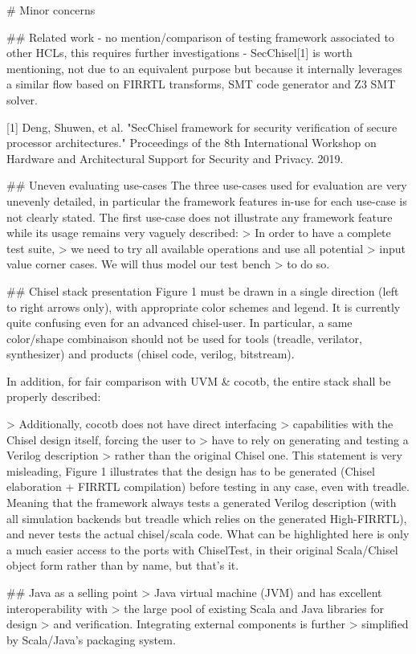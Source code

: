 \documentclass{article}
\begin{document}
\# Minor concerns

\#\# Related work
- no mention/comparison of testing framework associated to other HCLs, this requires further investigations
- SecChisel[1] is worth mentioning, not due to an equivalent purpose but because it internally leverages a similar flow based on FIRRTL transforms, SMT code generator and Z3 SMT solver.

[1] Deng, Shuwen, et al. "SecChisel framework for security verification of secure processor architectures." Proceedings of the 8th International Workshop on Hardware and Architectural Support for Security and Privacy. 2019.

\#\# Uneven evaluating use-cases
The three use-cases used for evaluation are very unevenly detailed, in particular the framework features in-use for each use-case is not clearly stated.
The first use-case does not illustrate any framework feature while its usage remains very vaguely described:
> In order to have a complete test suite,
> we need to try all available operations and use all potential
> input value corner cases. We will thus model our test bench
> to do so.  


\#\# Chisel stack presentation
Figure 1 must be drawn in a single direction (left to right arrows only), with appropriate color schemes and legend. It is currently quite confusing even for an advanced chisel-user.
In particular, a same color/shape combinaison should not be used for tools (treadle, verilator, synthesizer) and products (chisel code, verilog, bitstream).

In addition, for fair comparison with UVM \& cocotb, the entire stack shall be properly described:

> Additionally, cocotb does not have direct interfacing
> capabilities with the Chisel design itself, forcing the user to
> have to rely on generating and testing a Verilog description
> rather than the original Chisel one.
This statement is very misleading, Figure 1 illustrates that the design has to be generated (Chisel elaboration + FIRRTL compilation) before testing in any case, even with treadle.
Meaning that the framework always tests a generated Verilog description (with all simulation backends but treadle which relies on the generated High-FIRRTL), and never tests the actual chisel/scala code.
What can be highlighted here is only a much easier access to the ports with ChiselTest, in their original Scala/Chisel object form rather than by name, but that's it.


\#\# Java as a selling point
> Java virtual machine (JVM) and has excellent interoperability with
> the large pool of existing Scala and Java libraries for design
> and verification. Integrating external components is further
> simplified by Scala/Java's packaging system.
\end{document}
